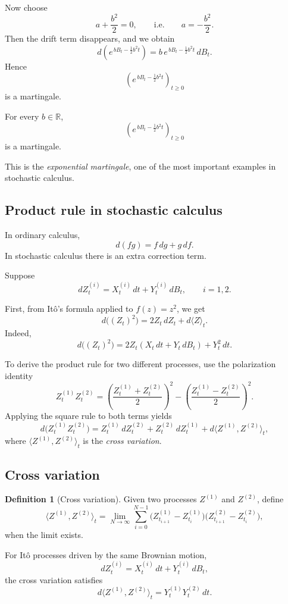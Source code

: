 \documentclass[11pt]{article}
\theoremstyle{definition}
\newtheorem{definition}[theorem]{Definition}
\begin{document}
Now choose
\[
a+\frac{b^2}{2}=0,
\qquad\text{i.e.}\qquad
a=-\frac{b^2}{2}.
\]
Then the drift term disappears, and we obtain
\[
d\left(e^{\,bB_t-\frac12 b^2 t}\right)
=
b\,e^{\,bB_t-\frac12 b^2 t}\,dB_t.
\]
Hence
\[
\left(e^{\,bB_t-\frac12 b^2 t}\right)_{t\ge 0}
\]
is a martingale.

\begin{keyformula}
For every \(b\in\mathbb R\),
\[
\left(e^{\,bB_t-\frac12 b^2 t}\right)_{t\ge 0}
\]
is a martingale.
\end{keyformula}

This is the \emph{exponential martingale}, one of the most important examples in stochastic calculus.

\subsection{Product rule in stochastic calculus}

In ordinary calculus,
\[
d(fg)=f\,dg+g\,df.
\]
In stochastic calculus there is an extra correction term.

Suppose
\[
dZ_t^{(i)}=X_t^{(i)}\,dt+Y_t^{(i)}\,dB_t,
\qquad i=1,2.
\]

First, from It\^o's formula applied to \(f(z)=z^2\), we get
\[
d\bigl((Z_t)^2\bigr)=2Z_t\,dZ_t+d\langle Z\rangle_t.
\]
Indeed,
\[
d\bigl((Z_t)^2\bigr)
=
2Z_t(X_t\,dt+Y_t\,dB_t)+Y_t^2\,dt.
\]

To derive the product rule for two different processes, use the polarization identity
\[
Z_t^{(1)}Z_t^{(2)}
=
\left(\frac{Z_t^{(1)}+Z_t^{(2)}}{2}\right)^2
-
\left(\frac{Z_t^{(1)}-Z_t^{(2)}}{2}\right)^2.
\]
Applying the square rule to both terms yields
\[
d\bigl(Z_t^{(1)}Z_t^{(2)}\bigr)
=
Z_t^{(1)}\,dZ_t^{(2)}
+
Z_t^{(2)}\,dZ_t^{(1)}
+
d\langle Z^{(1)},Z^{(2)}\rangle_t,
\]
where \(\langle Z^{(1)},Z^{(2)}\rangle_t\) is the \emph{cross variation}.

\subsection{Cross variation}

\begin{definition}[Cross variation]
Given two processes \(Z^{(1)}\) and \(Z^{(2)}\), define
\[
\langle Z^{(1)},Z^{(2)}\rangle_t
=
\lim_{N\to\infty}
\sum_{i=0}^{N-1}
\bigl(Z_{t_{i+1}}^{(1)}-Z_{t_i}^{(1)}\bigr)
\bigl(Z_{t_{i+1}}^{(2)}-Z_{t_i}^{(2)}\bigr),
\]
when the limit exists.
\end{definition}

For It\^o processes driven by the same Brownian motion,
\[
dZ_t^{(i)}=X_t^{(i)}\,dt+Y_t^{(i)}\,dB_t,
\]
the cross variation satisfies
\[
d\langle Z^{(1)},Z^{(2)}\rangle_t
=
Y_t^{(1)}Y_t^{(2)}\,dt.
\]
\end{document}
